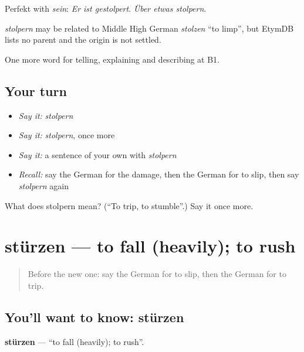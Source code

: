 Perfekt with \emph{sein}: \emph{Er ist gestolpert}. \emph{Über etwas stolpern}.

\begin{cousinweb}
\emph{stolpern} may be related to Middle High German \emph{stolzen} \textquotedblleft{}to limp\textquotedblright{}, but EtymDB lists no parent and the origin is not settled.
\end{cousinweb}

\begin{grammarlens}[title={What you've built}]
One more word for telling, explaining and describing at B1.
\end{grammarlens}

\subsection*{Your turn}
\begin{itemize}
\raggedright
  \item \emph{Say it:} \emph{stolpern}
  \item \emph{Say it:} \emph{stolpern}, once more
  \item \emph{Say it:} a sentence of your own with \emph{stolpern}
  \item \emph{Recall:} say the German for the damage, then the German for to slip, then say \emph{stolpern} again
\end{itemize}

\begin{tcolorbox}[breakable,colback=teal!4,colframe=teal!35!black,title={Before you move on}]
What does stolpern mean? (\textquotedblleft{}To trip, to stumble\textquotedblright{}.) Say it once more.
\end{tcolorbox}
\section[stürzen]{stürzen — to fall (heavily); to rush}

\label{lesson:GE-C289-stuerzen}



\begin{quote}
Before the new one: say the German for to slip, then the German for to trip.
\end{quote}

\subsection*{You'll want to know: stürzen}
\textbf{stürzen} — \textquotedblleft{}to fall (heavily); to rush\textquotedblright{}.

